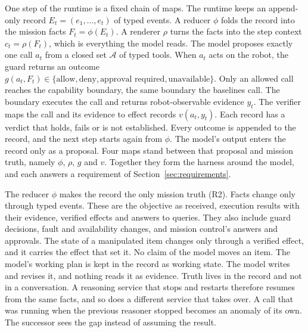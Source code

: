 One step of the runtime is a fixed chain of maps. The runtime keeps an append-only record $E_t=(e_1,\dots,e_t)$ of
typed events. A reducer $\phi$ folds the record into the mission facts $F_t=\phi(E_t)$. A renderer $\rho$ turns the
facts into the step context $c_t=\rho(F_t)$, which is everything the model reads. The model proposes exactly one call
$a_t$ from a closed set $\mathcal{A}$ of typed tools. When $a_t$ acts on the robot, the guard returns an outcome
$g(a_t,F_t)\in\{\text{allow},\text{deny},\text{approval required},\text{unavailable}\}$. Only an allowed call reaches
the capability boundary, the same boundary the baselines call. The boundary executes the call and returns
robot-observable evidence $y_t$. The verifier maps the call and its evidence to effect records $v(a_t,y_t)$. Each record
has a verdict that holds, fails or is not established. Every outcome is appended to the record, and the next step
starts again from $\phi$. The model's output enters the record only as a proposal. Four maps stand between that proposal
and mission truth, namely $\phi$, $\rho$, $g$ and $v$. Together they form the harness around the model, and each answers
a requirement of Section~\ref{sec:requirements}.

The reducer $\phi$ makes the record the only mission truth (R2). Facts change only through typed events. These are the
objective as received, execution results with their evidence, verified effects and answers to queries. They also
include guard decisions, fault and availability changes, and mission control's answers and approvals. The state of a
manipulated item changes only through a verified effect, and it carries the effect that set it. No claim of the model
moves an item. The model's working plan is kept in the record as working state. The model writes and revises it, and
nothing reads it as evidence. Truth lives in the record and not in a conversation. A reasoning service that stops and
restarts therefore resumes from the same facts, and so does a different service that takes over. A call that was
running when the previous reasoner stopped becomes an anomaly of its own. The successor sees the gap instead of assuming
the result.

